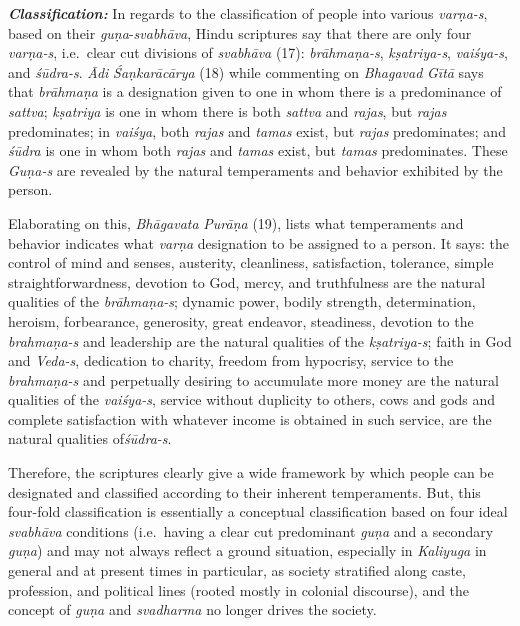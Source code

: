 \emph{\textbf{Classification:}} In regards to the classification of people into various \emph{varṇa-s}, based on their \emph{guṇa}-\emph{svabhāva}, Hindu scriptures say that there are only four \emph{varṇa-s}, i.e.\ clear cut divisions of \emph{svabhāva} (17): \emph{brāhmaṇa-s}, \emph{kṣatriya-s}, \emph{vaiśya-s}, and \emph{śūdra-s}. \emph{Ādi} \emph{Śaṇkarācārya} (18) while commenting on \emph{Bhagavad} \emph{Gītā} says that \emph{brāhmaṇa} is a designation given to one in whom there is a predominance of \emph{sattva}; \emph{kṣatriya} is one in whom there is both \emph{sattva} and \emph{rajas}, but \emph{rajas} predominates; in \emph{vaiśya}, both \emph{rajas} and \emph{tamas} exist, but \emph{rajas} predominates; and \emph{śūdra} is one in whom both \emph{rajas} and \emph{tamas} exist, but \emph{tamas} predominates. These \emph{Guṇa-s} are revealed by the natural temperaments and behavior exhibited by the person.

Elaborating on this, \emph{Bhāgavata} \emph{Purāṇa} (19), lists what temperaments and behavior indicates what \emph{varṇa} designation to be assigned to a person. It says: the control of mind and senses, austerity, cleanliness, satisfaction, tolerance, simple straightfor\-wa\-rdness, devotion to God, mercy, and truthfulness are the natural qualities of the \emph{brāhmaṇa-s}; dynamic power, bodily strength, determination, heroism, forbearance, generosity, great endeavor, steadiness, devotion to the \emph{brahmaṇa-s} and leadership are the natural qualities of the \emph{kṣatriya-s}; faith in God and \emph{Veda-s}, dedication to charity, freedom from hypocrisy, service to the \emph{brahmaṇa-s} and perpetually desiring to accumulate more money are the natural qualities of the \emph{vaiśya-s}, service without duplicity to others, cows and gods and complete satisfaction with whatever income is obtained in such service, are the natural qualities of\break \emph{śūdra-s}.

Therefore, the scriptures clearly give a wide framework by which people can be designated and classified according to their inherent temperaments. But, this four-fold classification is essentially a conceptual classification based on four ideal \emph{svabhāva} conditions (i.e.\ having a clear cut predominant \emph{guṇa} and a secondary \emph{guṇa}) and may not always reflect a ground situation, especially in \emph{Kaliyuga} in general and at present times in particular, as society stratified along caste, profession, and political lines (rooted mostly in colonial discourse), and the concept of \emph{guṇa} and \emph{svadharma} no longer drives the society.

